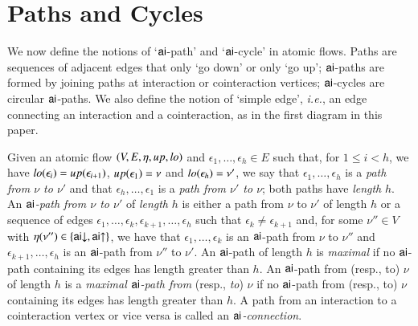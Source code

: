 


\section{Paths and Cycles}\label{section:PathsAndCycles}


We now define the notions of `${\mathsf{ai}}$-path' and `${\mathsf{ai}}$-cycle' in atomic flows. Paths are sequences of adjacent edges that only `go down' or only `go up'; ${\mathsf{ai}}$-paths are formed by joining paths at interaction or cointeraction vertices; ${\mathsf{ai}}$-cycles are circular ${\mathsf{ai}}$-paths. We also define the notion of `simple edge', \emph{i.e.}, an edge connecting an interaction and a cointeraction, as in the first diagram in this paper.

\begin{definition}\label{definition:FlowPaths}
Given an atomic flow $(V,E,\eta,{\mathit up},{\mathit lo})$ and $\epsilon_1,\dots,\epsilon_h\in E$ such that, for $1\le i<h$, we have ${\mathit lo}(\epsilon_i)={\mathit up}(\epsilon_{i+1})$, ${\mathit up}(\epsilon_1)=\nu$ and ${\mathit lo}(\epsilon_h)=\nu'$, we say that $\epsilon_1,\dots,\epsilon_h$ is a \emph{path from $\nu$ to $\nu'$} and that $\epsilon_h,\dots,\epsilon_1$ is a \emph{path from $\nu'$ to $\nu$}; both paths have \emph{length} $h$. An \emph{${\mathsf{ai}}$-path from $\nu$ to $\nu'$} of \emph{length} $h$ is either a path from $\nu$ to $\nu'$ of length $h$ or a sequence of edges $\epsilon_1,\dots,\epsilon_k,\epsilon_{k+1},\dots,\epsilon_h$ such that $\epsilon_k \ne \epsilon_{k+1}$ and, for some $\nu''\in V$ with $\eta(\nu'')\in\{{{\mathsf{ai}}{\downarrow}},{{\mathsf{ai}}{\uparrow}}\}$, we have that $\epsilon_1,\dots,\epsilon_k$ is an ${\mathsf{ai}}$-path from $\nu$ to $\nu''$ and $\epsilon_{k+1},\dots,\epsilon_h$ is an ${\mathsf{ai}}$-path from $\nu''$ to $\nu'$. An ${\mathsf{ai}}$-path of length $h$ is \emph{maximal} if no ${\mathsf{ai}}$-path containing its edges has length greater than $h$. An ${\mathsf{ai}}$-path from (resp., to) $\nu$ of length $h$ is a \emph{maximal\/ ${\mathsf{ai}}$-path from} (resp., \emph{to}) $\nu$ if no ${\mathsf{ai}}$-path from (resp., to) $\nu$ containing its edges has length greater than $h$. A path from an interaction to a cointeraction vertex or vice versa is called an \emph{${\mathsf{ai}}$-connection}.
\end{definition}

